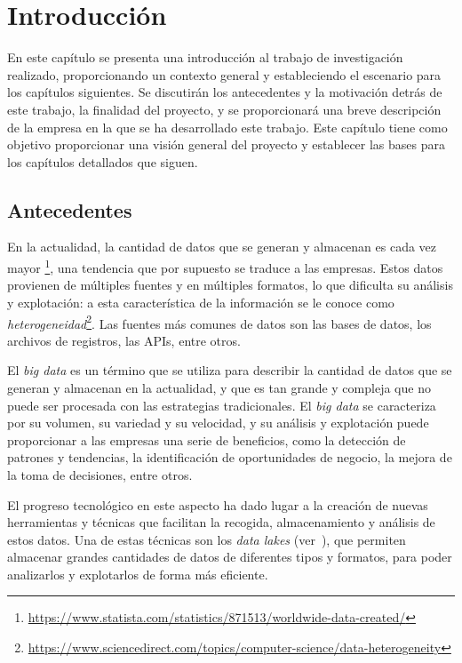\chapter{Introducción}\label{chap:intro}
En este capítulo se presenta una introducción al trabajo de investigación realizado, proporcionando
un contexto general y estableciendo el escenario para los capítulos siguientes. Se discutirán los
antecedentes y la motivación detrás de este trabajo, la finalidad del proyecto, y se proporcionará
una breve descripción de la empresa en la que se ha desarrollado este trabajo. Este capítulo tiene
como objetivo proporcionar una visión general del proyecto y establecer las bases para los capítulos
detallados que siguen.

\section{Antecedentes}\label{sec:antecedentes}
En la actualidad, la cantidad de datos que se generan y almacenan es cada vez mayor
\footnote{\url{https://www.statista.com/statistics/871513/worldwide-data-created/}}, una tendencia
que por supuesto se traduce a las empresas. Estos datos provienen de múltiples fuentes y en múltiples
formatos, lo que dificulta su análisis y explotación: a esta característica de la información se le
conoce como \textit{heterogeneidad}\footnote{\url{https://www.sciencedirect.com/topics/computer-science/data-heterogeneity}}.
Las fuentes más comunes de datos son las bases de datos, los archivos de registros, las APIs, entre
otros.

El \textit{big data} es un término que se utiliza para describir la cantidad de datos que se generan
y almacenan en la actualidad, y que es tan grande y compleja que no puede ser procesada con las
estrategias tradicionales. El \textit{big data} se caracteriza por su volumen, su variedad y su
velocidad, y su análisis y explotación puede proporcionar a las empresas una serie de beneficios,
como la detección de patrones y tendencias, la identificación de oportunidades de negocio, la
mejora de la toma de decisiones, entre otros.

El progreso tecnológico en este aspecto ha dado lugar a la creación de nuevas herramientas y técnicas
que facilitan la recogida, almacenamiento y análisis de estos datos. Una de estas técnicas son
los \textit{data lakes} (ver~), que permiten almacenar grandes cantidades
de datos de diferentes tipos y formatos, para poder analizarlos y explotarlos de forma más eficiente.

